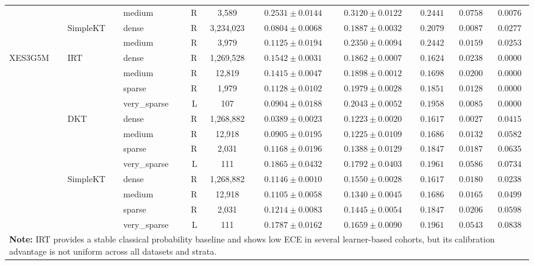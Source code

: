 \begin{table}[H]
{\begin{tabular}{lllrcccccc}
 &  & medium & R & 3,589 & $0.2531 \pm 0.0144$ & $0.3120 \pm 0.0122$ & $0.2441$ & $0.0758$ & $0.0076$ \\
 & SimpleKT & dense & R & 3,234,023 & $0.0804 \pm 0.0068$ & $0.1887 \pm 0.0032$ & $0.2079$ & $0.0087$ & $0.0277$ \\
 &  & medium & R & 3,979 & $0.1125 \pm 0.0194$ & $0.2350 \pm 0.0094$ & $0.2442$ & $0.0159$ & $0.0253$ \\
\midrule
XES3G5M & IRT & dense & R & 1,269,528 & $0.1542 \pm 0.0031$ & $0.1862 \pm 0.0007$ & $0.1624$ & $0.0238$ & $0.0000$ \\
 &  & medium & R & 12,819 & $0.1415 \pm 0.0047$ & $0.1898 \pm 0.0012$ & $0.1698$ & $0.0200$ & $0.0000$ \\
 &  & sparse & R & 1,979 & $0.1128 \pm 0.0102$ & $0.1979 \pm 0.0028$ & $0.1851$ & $0.0128$ & $0.0000$ \\
 &  & very\_sparse & L & 107 & $0.0904 \pm 0.0188$ & $0.2043 \pm 0.0052$ & $0.1958$ & $0.0085$ & $0.0000$ \\
 & DKT & dense & R & 1,268,882 & $0.0389 \pm 0.0023$ & $0.1223 \pm 0.0020$ & $0.1617$ & $0.0027$ & $0.0415$ \\
 &  & medium & R & 12,918 & $0.0905 \pm 0.0195$ & $0.1225 \pm 0.0109$ & $0.1686$ & $0.0132$ & $0.0582$ \\
 &  & sparse & R & 2,031 & $0.1168 \pm 0.0196$ & $0.1388 \pm 0.0129$ & $0.1847$ & $0.0187$ & $0.0635$ \\
 &  & very\_sparse & L & 111 & $0.1865 \pm 0.0432$ & $0.1792 \pm 0.0403$ & $0.1961$ & $0.0586$ & $0.0734$ \\
 & SimpleKT & dense & R & 1,268,882 & $0.1146 \pm 0.0010$ & $0.1550 \pm 0.0028$ & $0.1617$ & $0.0180$ & $0.0238$ \\
 &  & medium & R & 12,918 & $0.1105 \pm 0.0058$ & $0.1340 \pm 0.0045$ & $0.1686$ & $0.0165$ & $0.0499$ \\
 &  & sparse & R & 2,031 & $0.1214 \pm 0.0083$ & $0.1445 \pm 0.0054$ & $0.1847$ & $0.0206$ & $0.0598$ \\
 &  & very\_sparse & L & 111 & $0.1787 \pm 0.0162$ & $0.1659 \pm 0.0090$ & $0.1961$ & $0.0543$ & $0.0838$ \\
\bottomrule
\multicolumn{10}{p{17.5cm}}{\scriptsize \textbf{Note:} IRT provides a stable classical probability baseline and shows low ECE in several learner-based cohorts, but its calibration advantage is not uniform across all datasets and strata.} \\
\end{tabular}%
}
\end{table}
